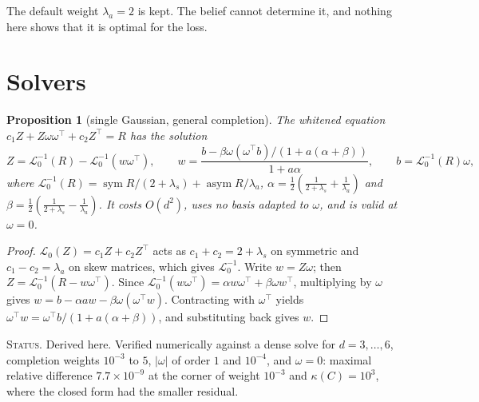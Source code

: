 \documentclass[11pt]{article}
\newtheorem{proposition}[theorem]{Proposition}
\theoremstyle{definition}
\theoremstyle{remark}
\newcommand{\sym}{\operatorname{sym}}
\newcommand{\asym}{\operatorname{asym}}
\newcommand{\status}[1]{\par\smallskip\noindent\textsc{Status.} #1\par\smallskip}
\begin{document}
The default weight $\lambda_a=2$ is kept. The belief cannot determine it, and nothing here shows that it is optimal for the loss.

\section{Solvers}\label{sec:solvers}

\begin{proposition}[single Gaussian, general completion]\label{prop:woodbury}
The whitened equation $c_1Z+Z\omega\omega^\top+c_2Z^\top=R$ has the solution
\begin{equation}\label{eq:woodbury}
Z=\mathcal{L}_0^{-1}(R)-\mathcal{L}_0^{-1}(w\omega^\top),\qquad w=\frac{b-\beta\omega(\omega^\top b)/(1+a(\alpha+\beta))}{1+a\alpha},\qquad b=\mathcal{L}_0^{-1}(R)\omega,
\end{equation}
where $\mathcal{L}_0^{-1}(R)=\sym R/(2+\lambda_s)+\asym R/\lambda_a$, $\alpha=\frac12(\frac1{2+\lambda_s}+\frac1{\lambda_a})$ and $\beta=\frac12(\frac1{2+\lambda_s}-\frac1{\lambda_a})$. It costs $O(d^2)$, uses no basis adapted to $\omega$, and is valid at $\omega=0$.
\end{proposition}
\begin{proof}
$\mathcal{L}_0(Z)=c_1Z+c_2Z^\top$ acts as $c_1+c_2=2+\lambda_s$ on symmetric and $c_1-c_2=\lambda_a$ on skew matrices, which gives $\mathcal{L}_0^{-1}$. Write $w=Z\omega$; then $Z=\mathcal{L}_0^{-1}(R-w\omega^\top)$. Since $\mathcal{L}_0^{-1}(w\omega^\top)=\alpha w\omega^\top+\beta\omega w^\top$, multiplying by $\omega$ gives $w=b-\alpha aw-\beta\omega(\omega^\top w)$. Contracting with $\omega^\top$ yields $\omega^\top w=\omega^\top b/(1+a(\alpha+\beta))$, and substituting back gives $w$.
\end{proof}
\status{Derived here. Verified numerically against a dense solve for $d=3,\dots,6$, completion weights $10^{-3}$ to $5$, $|\omega|$ of order $1$ and $10^{-4}$, and $\omega=0$: maximal relative difference $7.7\times10^{-9}$ at the corner of weight $10^{-3}$ and $\kappa(C)=10^3$, where the closed form had the smaller residual.}
\end{document}
